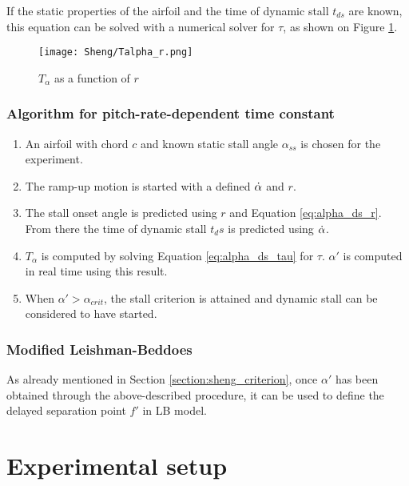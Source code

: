 If the static properties of the airfoil and the time of dynamic stall $t_{ds}$ are known, this equation can be solved with a numerical solver for $\tau$, as shown on Figure \ref{fig:Talpha_r}.

\begin{figure}[h]
	\centering
	\texttt{[image: Sheng/Talpha\_r.png]}
	\caption{$T_\alpha$ as a function of $r$}
	\label{fig:Talpha_r}
\end{figure}

\subsubsection{Algorithm for pitch-rate-dependent time constant}

\begin{enumerate}
\item An airfoil with chord $c$ and known static stall angle $\alpha_{ss}$ is chosen for the experiment. 
\item The ramp-up motion is started with a defined $\dot{\alpha}$ and $r$.
\item The stall onset angle is predicted using $r$ and Equation \eqref{eq:alpha_ds_r}. From there the time of dynamic stall $t_ds$ is predicted using $\dot{\alpha}$.
\item $T_\alpha$ is computed by solving Equation  \eqref{eq:alpha_ds_tau} for $\tau$. $\alpha'$ is computed in real time using this result. 
\item When $\alpha' > \alpha_{crit}$, the stall criterion is attained and dynamic stall can be considered to have started. 
\end{enumerate}

\subsubsection{Modified Leishman-Beddoes}

As already mentioned in Section \ref{section:sheng_criterion}, once $\alpha'$ has been obtained through the above-described procedure, it can be used to define the delayed separation point $f'$ in LB model.   

\section{Experimental setup}



